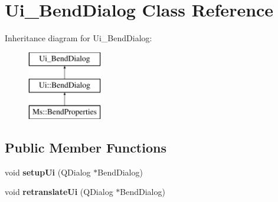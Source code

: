 \hypertarget{class_ui___bend_dialog}{}\section{Ui\+\_\+\+Bend\+Dialog Class Reference}
\label{class_ui___bend_dialog}
Inheritance diagram for Ui\+\_\+\+Bend\+Dialog\+:\begin{figure}[H]
\begin{center}
\leavevmode
\includegraphics[height=3.000000cm]{class_ui___bend_dialog}
\end{center}
\end{figure}
\subsection*{Public Member Functions}
\begin{DoxyCompactItemize}
\item 
\mbox{\label{class_ui___bend_dialog_ac5a9b60cd3fa780293d2f611059de6f6}} 
void {\bfseries setup\+Ui} (Q\+Dialog $\ast$Bend\+Dialog)
\item 
\mbox{\label{class_ui___bend_dialog_a5cbe121f59e7aae25d24db62751f5af2}} 
void {\bfseries retranslate\+Ui} (Q\+Dialog $\ast$Bend\+Dialog)
\end{DoxyCompactItemize}
